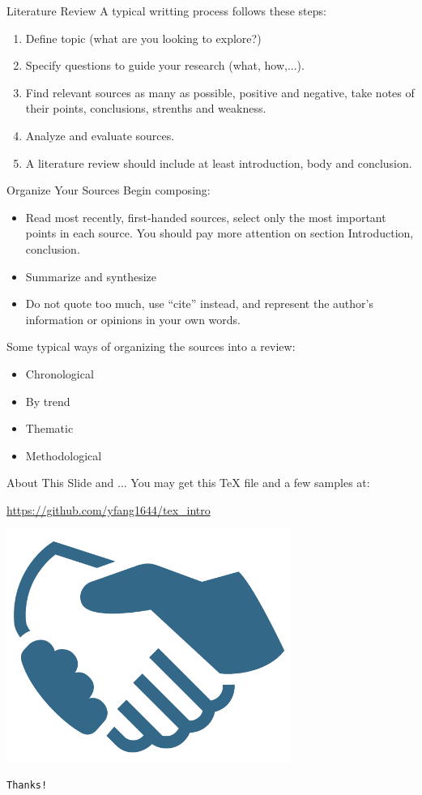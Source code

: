 \documentclass[10pt]{beamer}
\begin{document}
\begin{frame}[t]{Literature Review}
A typical writting process follows these steps:
\begin{enumerate}
    \item Define topic (what are you looking to explore?)
    \item Specify questions to guide your research (what, how,...).
    \item Find relevant sources as many as possible, positive
        and negative, take notes of their points, conclusions,
        strenths and weakness.
    \item Analyze and evaluate sources.
    \item A literature review should include at least introduction,
        body and conclusion.
\end{enumerate}
\end{frame}

\begin{frame}[t]{Organize Your Sources}
Begin composing:
\begin{itemize}
    \item Read most recently, first-handed sources, select only
        the most important points in each source. You should pay
        more attention on section \alert{Introduction},
        \alert{conclusion}.
    \item Summarize and synthesize
    \item Do not quote too much, use ``\alert{cite}'' instead, and
        represent the author's information or opinions in your own words.
\end{itemize}
Some typical ways of organizing the sources into a review:
\begin{itemize}
    \item Chronological
    \item By trend
    \item Thematic
    \item Methodological
\end{itemize}
\end{frame}

\begin{frame}{About This Slide and ...}
    You may get this \TeX{} file and a few samples at:

   \url{https://github.com/yfang1644/tex_intro}
\end{frame}


\begin{frame}

\centering
\includegraphics[width=.5\textwidth]{shakinghands.png}

    \texttt{\Huge Thanks!}
\end{frame}
\end{document}
